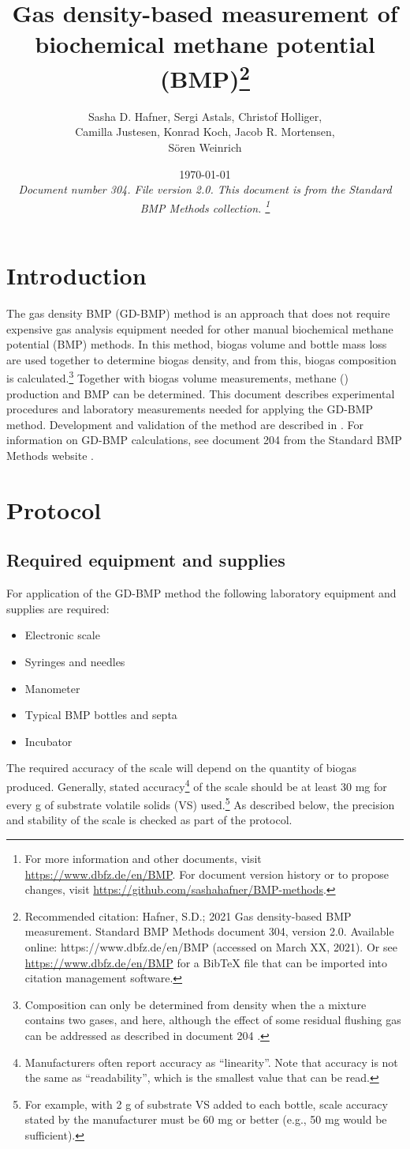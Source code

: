 \documentclass[]{article}
\title {Gas density-based measurement of biochemical methane potential (BMP)\footnote{
  Recommended citation: 
Hafner, S.D.; 2021 Gas density-based BMP measurement. Standard BMP Methods document 304, version 2.0. Available online: https://www.dbfz.de/en/BMP (accessed on March XX, 2021).
\newline
  Or see \url{https://www.dbfz.de/en/BMP} for a BibTeX file that can be imported into citation management software.
}
}
\author{Sasha D. Hafner, Sergi Astals, Christof Holliger, \\ Camilla Justesen, Konrad Koch, Jacob R. Mortensen, \\ S\"oren Weinrich}
\date{\today \\
\bigskip
\textit{
  Document number 304.
  File version 2.0. 
  This document is from the Standard BMP Methods collection.
    \footnote{For more information and other documents, visit \url{https://www.dbfz.de/en/BMP}. 
    For document version history or to propose changes, visit \url{https://github.com/sashahafner/BMP-methods}.}
}
}
\begin{document}
\maketitle

\section{Introduction}
The gas density BMP (GD-BMP) method is an approach that does not require expensive gas analysis equipment needed for other manual biochemical methane potential (BMP) methods.
In this method, biogas volume and bottle mass loss are used together to determine biogas density, and from this, biogas composition is calculated.\footnote{Composition can only be determined from density when the a mixture contains two gases,  and  here, although the effect of some residual flushing gas can be addressed as described in document 204 \citep{BMPdoc204gasdens}.}
Together with biogas volume measurements, methane () production and BMP can be determined.
This document describes experimental procedures and laboratory measurements needed for applying the GD-BMP method.
Development and validation of the method are described in \citet{justesenDevelopmentValidationLowcost2019}.
For information on GD-BMP calculations, see document 204 from the Standard BMP Methods website \citep{BMPdoc204gasdens}. 

\section{Protocol}
\subsection{Required equipment and supplies}
For application of the GD-BMP method the following laboratory equipment and supplies are required:
\begin{itemize}
    \item Electronic scale
    \item Syringes and needles
    \item Manometer
    \item Typical BMP bottles and septa
    \item Incubator
\end{itemize}

The required accuracy of the scale will depend on the quantity of biogas produced. 
Generally, stated accuracy\footnote{
  Manufacturers often report accuracy as ``linearity''. 
  Note that accuracy is not the same as ``readability'', which is the smallest value that can be read. 
} of the scale should be at least 30 mg for every g of substrate volatile solids (VS) used.\footnote{
  For example, with 2 g of substrate VS added to each bottle, scale accuracy stated by the manufacturer must be 60 mg or better (e.g., 50 mg would be sufficient).
}
As described below, the precision and stability of the scale is checked as part of the protocol.
\end{document}
